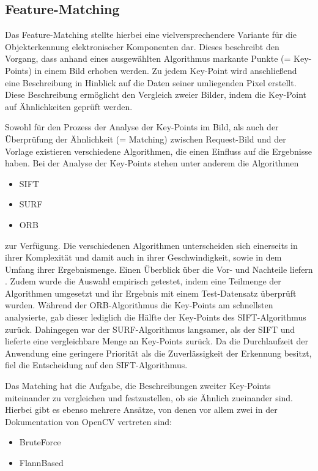 \documentclass[
    type=Projektarbeit,
    status=draft, %
    language=german, %
    bibengine=bibtex,
]{unibwm-inf-thesis}
\begin{document}
    \subsection{Feature-Matching}
    Das Feature-Matching stellte hierbei eine vielversprechendere Variante für die Objekterkennung elektronischer Komponenten dar.
    Dieses beschreibt den Vorgang, dass anhand eines ausgewählten Algorithmus markante Punkte (= Key-Points) in einem Bild erhoben werden.
    Zu jedem Key-Point wird anschließend eine Beschreibung in Hinblick auf die Daten seiner umliegenden Pixel erstellt.
    Diese Beschreibung ermöglicht den Vergleich zweier Bilder, indem die Key-Point auf Ähnlichkeiten geprüft werden.\cite{CV2FeatureMathing2022}

    Sowohl für den Prozess der Analyse der Key-Points im Bild, als auch der Überprüfung der Ähnlichkeit (= Matching) zwischen Request-Bild und der Vorlage
    existieren verschiedene Algorithmen, die einen Einfluss auf die Ergebnisse haben.
    Bei der Analyse der Key-Points stehen unter anderem die Algorithmen
    \begin{itemize}
        \item SIFT
        \item SURF
        \item ORB
    \end{itemize}
    zur Verfügung.
    Die verschiedenen Algorithmen unterscheiden sich einerseits in ihrer Komplexität und damit auch in ihrer Geschwindigkeit, sowie in dem Umfang ihrer Ergebnismenge.
    Einen Überblick über die Vor- und Nachteile liefern \citet{Karami2017}.
    Zudem wurde die Auswahl empirisch getestet, indem eine Teilmenge der Algorithmen umgesetzt und ihr Ergebnis mit einem Test-Datensatz überprüft wurden.
    Während der ORB-Algorithmus die Key-Points am schnellsten analysierte, gab dieser lediglich die Hälfte der Key-Points des SIFT-Algorithmus zurück.
    Dahingegen war der SURF-Algorithmus langsamer, als der SIFT und lieferte eine vergleichbare Menge an Key-Points zurück.
    Da die Durchlaufzeit der Anwendung eine geringere Priorität als die Zuverlässigkeit der Erkennung besitzt, fiel die Entscheidung auf den SIFT-Algorithmus.

    Das Matching hat die Aufgabe, die Beschreibungen zweiter Key-Points miteinander zu vergleichen und festzustellen, ob sie Ähnlich zueinander sind.
    Hierbei gibt es ebenso mehrere Ansätze, von denen vor allem zwei in der Dokumentation von OpenCV vertreten sind:
    \begin{itemize}
        \item BruteForce
        \item FlannBased
    \end{itemize}
\end{document}
